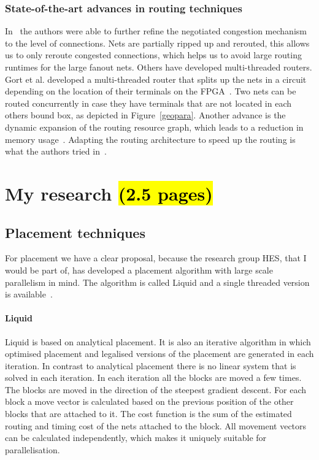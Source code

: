 \documentclass[a4paper,oneside,12pt]{article}
\begin{document}
\subsubsection{State-of-the-art advances in routing techniques}
In~\cite{vansteenkiste2013connection} the authors were able to further refine the negotiated congestion mechanism to the level of connections. Nets are partially ripped up and rerouted, this allows us to only reroute congested connections, which helps us to avoid large routing runtimes for the large fanout nets. Others have developed multi-threaded routers. Gort et al. developed a multi-threaded router that splits up the nets in a circuit depending on the location of their terminals on the FPGA~\cite{gort2010deterministic}. Two nets can be routed concurrently in case they have terminals that are not located in each others bound box, as depicted in Figure~\ref{geopara}.
Another advance is the dynamic expansion of the routing resource graph, which leads to a reduction in memory usage~\cite{moctar2015fast}. 	
Adapting the routing architecture to speed up the routing is what the authors tried in~\cite{gort2013combined}.


\section{My research \hl{(2.5 pages)}}

\subsection{Placement techniques}\label{placetech}

For placement we have a clear proposal, because the research group HES, that I would be part of, has developed a placement algorithm with large scale parallelism in mind. The algorithm is called {\sc Liquid} and a single threaded version is available~\cite{liquid}.

\paragraph{{\sc Liquid}}
{\sc Liquid} is based on analytical placement. It is also an iterative algorithm in which optimised placement and legalised versions of the placement are generated in each iteration. In contrast to analytical placement there is no linear system that is solved in each iteration. In each iteration all the blocks are moved a few times.  The blocks are moved in the direction of the steepest gradient descent. For each block a move vector is calculated based on the previous position of the other blocks that are attached to it. The cost function is the sum of the estimated routing and timing cost of the nets attached to the block. All movement vectors can be calculated independently, which makes it uniquely suitable for parallelisation.
\end{document}
